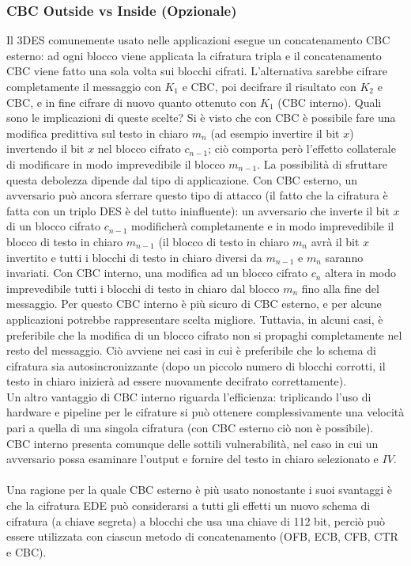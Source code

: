 \subsubsection{CBC Outside vs Inside (Opzionale)}
Il 3DES comunemente usato nelle applicazioni esegue un concatenamento CBC esterno: ad ogni blocco viene applicata la cifratura tripla e il concatenamento CBC viene fatto una sola volta sui blocchi cifrati. L'alternativa sarebbe cifrare completamente il messaggio con $K_{1}$ e CBC, poi decifrare il risultato con $K_{2}$ e CBC, e in fine cifrare di nuovo quanto ottenuto con $K_{1}$ (CBC interno). Quali sono le implicazioni di queste scelte?
\newline \newline
Si è visto che con CBC è possibile fare una modifica predittiva sul testo in chiaro $m_{n}$ (ad esempio invertire il bit $x$) invertendo il bit $x$ nel blocco cifrato $c_{n-1}$; ciò comporta però l'effetto collaterale di modificare in modo imprevedibile il blocco $m_{n-1}$. La possibilità di sfruttare questa debolezza dipende dal tipo di applicazione.
\newline \newline
Con CBC esterno, un avversario può ancora sferrare questo tipo di attacco (il fatto che la cifratura è fatta con un triplo DES è del tutto ininfluente): un avversario che inverte il bit $x$ di un blocco cifrato $c_{n-1}$ modificherà completamente e in modo imprevedibile il blocco di testo in chiaro $m_{n-1}$ (il blocco di testo in chiaro $m_{n}$ avrà il bit $x$ invertito e tutti i blocchi di testo in chiaro diversi da $m_{n-1}$ e $m_{n}$ saranno invariati.
\newline \newline
Con CBC interno, una modifica ad un blocco cifrato $c_{n}$ altera in modo imprevedibile tutti i blocchi di testo in chiaro dal blocco $m_{n}$ fino alla fine del messaggio. Per questo CBC interno è più sicuro di CBC esterno, e per alcune applicazioni potrebbe rappresentare scelta migliore. Tuttavia, in alcuni casi, è preferibile che la modifica di un blocco cifrato non si propaghi completamente nel resto del messaggio. Ciò avviene nei casi in cui è preferibile che lo schema di cifratura sia autosincronizzante (dopo un piccolo numero di blocchi corrotti, il testo in chiaro inizierà ad essere nuovamente decifrato correttamente). \\
Un altro vantaggio di CBC interno riguarda l'efficienza: triplicando l'uso di hardware e pipeline per le cifrature si può ottenere complessivamente una velocità pari a quella di una singola cifratura (con CBC esterno ciò non è possibile).\\
CBC interno presenta comunque delle sottili vulnerabilità, nel caso in cui un avversario possa esaminare l'output e fornire del testo in chiaro selezionato e $IV$.\\ \\
Una ragione per la quale CBC esterno è più usato nonostante i suoi svantaggi è che la cifratura EDE può considerarsi a tutti gli effetti un nuovo schema di cifratura (a chiave segreta) a blocchi che usa una chiave di 112 bit, perciò può essere utilizzata con ciascun metodo di concatenamento (OFB, ECB, CFB, CTR e CBC).

